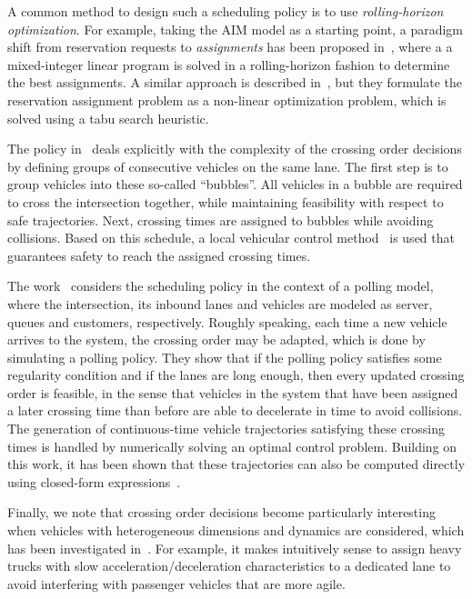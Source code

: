 \documentclass[a4paper]{report}
\theoremstyle{definition}
\theoremstyle{plain}
\begin{document}
A common method to design such a scheduling policy is to use
\emph{rolling-horizon optimization}. For example, taking the AIM model as a
starting point, a paradigm shift from reservation requests to \emph{assignments}
has been proposed in~\cite{levinConflictpointFormulationIntersection2017}, where
a a mixed-integer linear program is solved in a rolling-horizon fashion to
determine the best assignments.
%
A similar approach is described
in~\cite{liTemporalspatialDimensionExtensionbased2019}, but they formulate the
reservation assignment problem as a non-linear optimization problem, which is
solved using a tabu search heuristic.

The policy in~\cite{tallapragadaHierarchicaldistributedOptimizedCoordination2017} deals explicitly with the complexity of the crossing order
decisions by defining groups of consecutive vehicles on the same lane. The first
step is to group vehicles into these so-called ``bubbles''. All vehicles in a
bubble are required to cross the intersection together, while maintaining
feasibility with respect to safe trajectories. Next, crossing times are assigned
to bubbles while avoiding collisions. Based on this schedule, a local vehicular
control method~\cite{tallapragadaDistributedControlVehicle2017} is used that guarantees safety to reach the assigned
crossing times.

The work~\cite{miculescuPollingsystemsbasedAutonomousVehicle2016} considers the scheduling policy in the context of a polling
model, where the intersection, its inbound lanes and vehicles are modeled as
server, queues and customers, respectively.
%
Roughly speaking, each time a new vehicle arrives to the system, the crossing
order may be adapted, which is done by simulating a polling policy.
%
They show that if the polling policy satisfies some regularity condition and if
the lanes are long enough, then every updated crossing order is feasible, in the
sense that vehicles in the system that have been assigned a later crossing time
than before are able to decelerate in time to avoid collisions.
%
The generation of continuous-time vehicle trajectories satisfying these crossing
times is handled by numerically solving an optimal control problem.
Building on this work, it has been shown that these trajectories can also be
computed directly using closed-form
expressions~\cite{timmermanPlatoonFormingAlgorithms2021}.

Finally, we note that crossing order decisions become particularly interesting
when vehicles with heterogeneous dimensions and dynamics are considered, which
has been investigated in~\cite{joshiTrajectoriesPlatoonformingAlgorithm2025}.
For example, it makes intuitively sense to assign heavy trucks with slow
acceleration/deceleration characteristics to a dedicated lane to avoid
interfering with passenger vehicles that are more agile.
\end{document}
